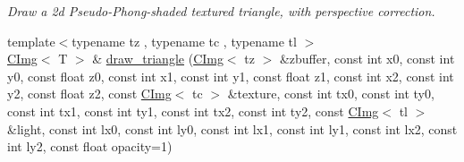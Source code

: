 \begin{DoxyCompactItemize}
\begin{DoxyCompactList}\small\item\em Draw a 2d Pseudo-\/Phong-\/shaded textured triangle, with perspective correction. \item\end{DoxyCompactList}\item 
\hypertarget{structcimg__library_1_1CImg_af8cb369464aaf83a6e4f99c4f188c2a1}{
{\footnotesize template$<$typename tz , typename tc , typename tl $>$ }\\\hyperlink{structcimg__library_1_1CImg}{CImg}$<$ T $>$ \& \hyperlink{structcimg__library_1_1CImg_af8cb369464aaf83a6e4f99c4f188c2a1}{draw\_\-triangle} (\hyperlink{structcimg__library_1_1CImg}{CImg}$<$ tz $>$ \&zbuffer, const int x0, const int y0, const float z0, const int x1, const int y1, const float z1, const int x2, const int y2, const float z2, const \hyperlink{structcimg__library_1_1CImg}{CImg}$<$ tc $>$ \&texture, const int tx0, const int ty0, const int tx1, const int ty1, const int tx2, const int ty2, const \hyperlink{structcimg__library_1_1CImg}{CImg}$<$ tl $>$ \&light, const int lx0, const int ly0, const int lx1, const int ly1, const int lx2, const int ly2, const float opacity=1)}
\label{structcimg__library_1_1CImg_af8cb369464aaf83a6e4f99c4f188c2a1}


\end{DoxyCompactItemize}
